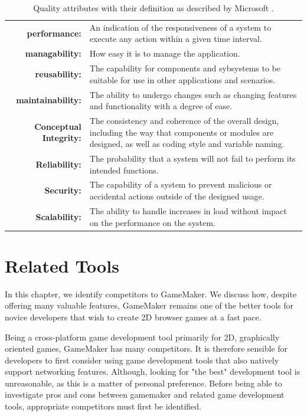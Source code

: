 \documentclass[bsc, 12pt, twoside, singlespacing, parskip, abbrevs, notimes, normalheadings, logo]{styles/infthesis}
\begin{document}
\begin{table}[H]
\centering
  \begin{tabularx}{\textwidth}{r X}
	\textbf{performance:} & An indication of the responsiveness of a system to execute any action within a given time interval.\\
	\textbf{managability:} & How easy it is to manage the application.\\
	\textbf{reusability:} & The capability for components and sybsystems to be suitable for use in other applications and scenarios.\\
	\textbf{maintainability:} & The ability to undergo changes such as changing features and functionality with a degree of ease.\\
	\textbf{Conceptual Integrity:} & The consistency and coherence of the overall design, including the way that components or modules are designed, as well as coding style and variable naming.\\
	\textbf{Reliability:} & The probability that a system will not fail to perform its intended functions. \\
	\textbf{Security:} & The capability of a system to prevent malicious or accidental actions outside of the designed usage. \\
	\textbf{Scalability:} & The ability to handle increases in load without impact on the performance on the system. \\
  \end{tabularx}
  \caption{Quality attributes with their definition as described by Microsoft \cite{quality_attributes}.}
\label{table:quality_attributes}
\end{table}

\chapter{Related Tools}
\vspace{-1em}
In this chapter, we identify competitors to GameMaker. We discuss how, despite offering many valuable features, GameMaker remains one of the better tools for novice developers that wish to create 2D browser games at a fast pace.

Being a cross-platform game development tool primarily for 2D, graphically oriented games, GameMaker has many competitors. It is therefore sensible for developers to first consider using game development tools that also natively support networking features. Although, looking for "the best" development tool is unreasonable, as this is a matter of personal preference. Before being able to investigate pros and cons between gamemaker and related game development tools, appropriate competitors must first be identified.
\end{document}
